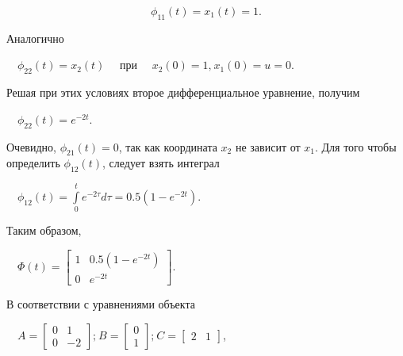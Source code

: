 \documentclass[a4paper]{article}
\begin{document}
\begin{equation*}
ϕ_{11}\left(t\right)=x_1\left(t\right)=1.
\end{equation*}
{\begin{russian}\sffamily
Аналогично
\end{russian}}

{\begin{russian}\sffamily
\ \  $ϕ_{22}\left(t\right)=x_2\left(t\right)$ \ \ при \ \  $x_2\left(0\right)=1,_{}^{}x_1\left(0\right)=u=0$.
\end{russian}}

{\begin{russian}\sffamily
Решая при этих условиях второе дифференциальное уравнение, получим 
\end{russian}}

{\begin{russian}\sffamily
\ \  $ϕ_{22}\left(t\right)=e^{-2t}$.
\end{russian}}

{\begin{russian}\sffamily
Очевидно,  $ϕ_{21}\left(t\right)=0$, так как координата  $x_2$ не зависит от  $x_1$. Для того чтобы определить 
$ϕ_{12}\left(t\right)$, следует взять интеграл
\end{russian}}


\bigskip

{\begin{russian}\sffamily
\ \  $ϕ_{12}\left(t\right)=\overset t{\underset 0{\int }}e^{-2τ}\mathit{dτ}=0.5\left(1-e^{-2t}\right)$.
\end{russian}}

{\begin{russian}\sffamily
Таким образом,
\end{russian}}

{\begin{russian}\sffamily
\ \  $Φ(t)=\left[\begin{matrix}1&0.5\left(1-e^{-2t}\right)\\0&e^{-2t}\end{matrix}\right]$.
\end{russian}}

{\begin{russian}\sffamily
В соответствии с уравнениями объекта
\end{russian}}

{\begin{russian}\sffamily
\ \ 
$A=\left[\begin{matrix}0&1\\0&-2\end{matrix}\right];_{}^{}B=\left[\begin{matrix}0\\1\end{matrix}\right];_{}^{}C=\left[\begin{matrix}2&1\end{matrix}\right]$,
\end{russian}}
\end{document}
